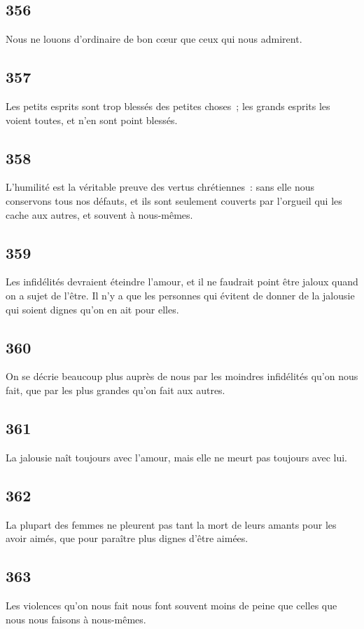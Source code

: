 \documentclass[french,twoside]{book} %
\begin{document}
\subsection[{356}]{ \textsc{356} }
\noindent Nous ne louons d’ordinaire de bon cœur que ceux qui nous admirent.
\subsection[{357}]{ \textsc{357} }
\noindent Les petits esprits sont trop blessés des petites choses ; les grands esprits les voient toutes, et n’en sont point blessés.
\subsection[{358}]{ \textsc{358} }
\noindent L’humilité est la véritable preuve des vertus chrétiennes : sans elle nous conservons tous nos défauts, et ils sont seulement couverts par l’orgueil qui les cache aux autres, et souvent à nous-mêmes.
\subsection[{359}]{ \textsc{359} }
\noindent Les infidélités devraient éteindre l’amour, et il ne faudrait point être jaloux quand on a sujet de l’être. Il n’y a que les personnes qui évitent de donner de la jalousie qui soient dignes qu’on en ait pour elles.
\subsection[{360}]{ \textsc{360} }
\noindent On se décrie beaucoup plus auprès de nous par les moindres infidélités qu’on nous fait, que par les plus grandes qu’on fait aux autres.
\subsection[{361}]{ \textsc{361} }
\noindent La jalousie naît toujours avec l’amour, mais elle ne meurt pas toujours avec lui.
\subsection[{362}]{ \textsc{362} }
\noindent La plupart des femmes ne pleurent pas tant la mort de leurs amants pour les avoir aimés, que pour paraître plus dignes d’être aimées.
\subsection[{363}]{ \textsc{363} }
\noindent Les violences qu’on nous fait nous font souvent moins de peine que celles que nous nous faisons à nous-mêmes.
\end{document}
